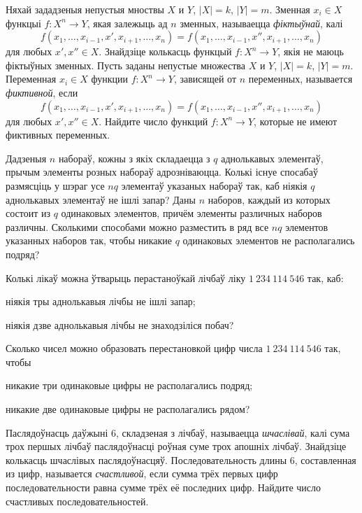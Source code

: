 \begin{problemList}
\problemItemSimple
{Няхай зададзеныя непустыя мноствы $X$ и $Y$, $|X| = k$, $|Y| = m$.
Зменная $x_i \in X$ функцыі $f\colon X^n \to Y$, якая залежыць ад $n$ зменных,
называецца \emph{фіктыўнай}, калі $$f(x_1, \ldots, x_{i - 1}, x', x_{i + 1}, \ldots, x_n) =
f(x_1, \ldots, x_{i - 1}, x'', x_{i + 1}, \ldots, x_n)$$ для любых $x', x'' \in X$.
Знайдзіце колькасць функцый $f\colon X^n \to Y$, якія не маюць фіктыўных зменных.}
{Пусть заданы непустые множества $X$ и $Y$, $|X| = k$, $|Y| = m$.
Переменная $x_i \in X$ функции $f\colon X^n \to Y$, зависящей от $n$ переменных,
называется \emph{фиктивной}, если $$f(x_1, \ldots, x_{i - 1}, x', x_{i + 1}, \ldots, x_n) =
f(x_1, \ldots, x_{i - 1}, x'', x_{i + 1}, \ldots, x_n)$$ для любых $x', x'' \in X$.
Найдите число функций $f\colon X^n \to Y$, которые не имеют фиктивных переменных.}

\bigskip

\problemItemSimple
{Дадзеныя $n$ набораў, кожны з якіх складаецца з $q$ аднолькавых элементаў, прычым
элементы розных набораў адрозніваюцца. Колькі існуе спосабаў размясціць у шэраг
усе $nq$ элементаў указаных набораў так, каб ніякія $q$ аднолькавых элементаў
не ішлі запар?}
{Даны $n$ наборов, каждый из которых состоит из $q$ одинаковых элементов, причём
элементы различных наборов различны. Сколькими способами можно разместить в ряд
все $nq$ элементов указанных наборов так, чтобы никакие $q$ одинаковых элементов
не располагались подряд?}

\bigskip

\problemItemSimple
{%
Колькі лікаў можна ўтварыць перастаноўкай лічбаў ліку $1~234~114~546$ так, каб:
\begin{belarusianEnumerate}
  \item ніякія тры аднолькавыя лічбы не ішлі запар;
  \item ніякія дзве аднолькавыя лічбы не знаходзіліся побач?
\end{belarusianEnumerate}
}
{%
Сколько чисел можно образовать перестановкой цифр числа $1~234~114~546$ так, чтобы
\begin{russianEnumerate}
  \item никакие три одинаковые цифры не располагались подряд;
  \item никакие две одинаковые цифры не располагались рядом?
\end{russianEnumerate}
}

\bigskip

\problemItemSimple
{Паслядоўнасць даўжыні 6, складзеная з лічбаў, называецца \emph{шчаслівай},
калі сума трох першых лічбаў паслядоўнасці роўная суме трох апошніх лічбаў.
Знайдзіце колькасць шчаслівых паслядоўнасцяў.}
{Последовательность длины 6, составленная из цифр, называется \emph{счастливой},
если сумма трёх первых цифр последовательности равна сумме трёх её последних цифр.
Найдите число счастливых последовательностей.}


\end{problemList}
